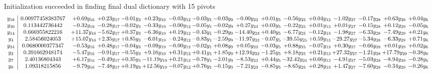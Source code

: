 \documentclass[9pt]{article}
\begin{document}
Initialization succeeded in finding final dual dictionary with 15 pivots
\[\begin{array}{c| c c@{\hskip 2pt} c@{\hskip 2pt} c@{\hskip 2pt} c@{\hskip 2pt} c@{\hskip 2pt} c@{\hskip 2pt} c@{\hskip 2pt} c@{\hskip 2pt} c@{\hskip 2pt} c@{\hskip 2pt} c@{\hskip 2pt} c@{\hskip 2pt} c@{\hskip 2pt} c@{\hskip 2pt} c@{\hskip 2pt} }
 y_{18}   &  0.00977458383767 & +  0.69 y_{16} & +  0.23 y_{17} & -0.01 y_{3} & +  0.23 y_{19} & -0.03 y_{12} & -0.03 y_{1} & -0.03 y_{9} & -0.00 y_{23} & +  0.01 y_{5} & -0.56 y_{25} & +  0.04 y_{13} & -1.02 y_{27} & -0.17 y_{28} & +  0.63 y_{29} & +  0.04 y_{6}\\
 y_{30}   &  0.113442736442 & -0.32 y_{16} & -0.28 y_{17} & -0.02 y_{3} & -0.33 y_{19} & -0.00 y_{12} & -0.05 y_{1} & -0.02 y_{9} & +  0.27 y_{23} & +  0.03 y_{5} & -0.22 y_{25} & +  0.01 y_{13} & +  0.01 y_{27} & -0.15 y_{28} & +  0.12 y_{29} & -0.05 y_{6}\\
 y_{14}   &  0.666955822216 & + 11.37 y_{16} & -5.62 y_{17} & +  0.37 y_{3} & -6.36 y_{19} & +  0.19 y_{12} & -0.43 y_{1} & -0.29 y_{9} & -14.40 y_{23} & +  0.40 y_{5} & -6.77 y_{25} & -0.12 y_{13} & -1.98 y_{27} & -6.33 y_{28} & -7.49 y_{29} & +  0.21 y_{6}\\
 y_{4}   &  2.58456024053 & + 15.07 y_{16} & +  2.35 y_{17} & +  0.85 y_{3} & -6.01 y_{19} & -0.24 y_{12} & -0.83 y_{1} & -2.59 y_{9} & -11.97 y_{23} & -0.07 y_{5} & -39.55 y_{25} & +  0.59 y_{13} & -29.27 y_{27} & -5.34 y_{28} & -6.33 y_{29} & +  0.71 y_{6}\\
 y_{24}   &  0.0680000377347 & -0.53 y_{16} & +  0.48 y_{17} & -0.04 y_{3} & -0.09 y_{19} & -0.00 y_{12} & -0.02 y_{1} & +  0.08 y_{9} & +  0.05 y_{23} & -0.03 y_{5} & +  0.88 y_{25} & -0.07 y_{13} & +  0.30 y_{27} & -0.66 y_{28} & +  0.01 y_{29} & +  0.02 y_{6}\\
 y_{2}   &  0.391662948174 & -5.47 y_{16} & -0.91 y_{17} & -0.55 y_{3} & +  9.16 y_{19} & +  0.31 y_{12} & +  0.41 y_{1} & +  1.85 y_{9} & + 12.94 y_{23} & -1.25 y_{5} & +  8.18 y_{25} & +  0.21 y_{13} & + 27.32 y_{27} & -1.21 y_{28} & + 17.79 y_{29} & -0.38 y_{6}\\
 y_{7}   &  2.40136804343 & +  6.17 y_{16} & -0.49 y_{17} & +  0.35 y_{3} & -11.19 y_{19} & +  0.21 y_{12} & -0.78 y_{1} & -2.01 y_{9} & -8.53 y_{23} & +  0.44 y_{5} & -32.42 y_{25} & +  0.66 y_{13} & -4.91 y_{27} & -5.03 y_{28} & -8.94 y_{29} & -0.28 y_{6}\\
 y_{8}   &  1.09318215856 & -9.79 y_{16} & -7.48 y_{17} & +  0.19 y_{3} & + 12.56 y_{19} & -0.07 y_{12} & +  0.76 y_{1} & -0.15 y_{9} & -7.21 y_{23} & -0.85 y_{5} & -8.65 y_{25} & +  0.28 y_{13} & +  1.47 y_{27} & -7.60 y_{28} & -0.34 y_{29} & -0.26 y_{6}\\

\end{array}\]
\end{document}
